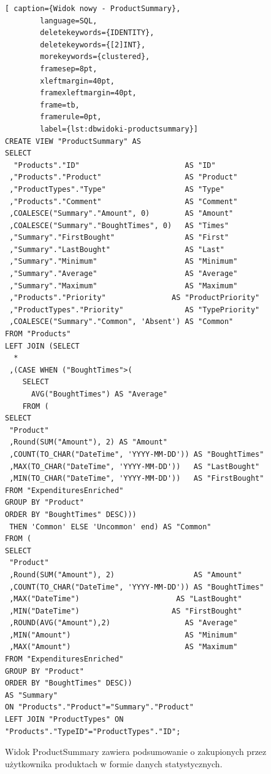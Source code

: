 \documentclass[a4paper,10pt, twoside]{report}
\begin{document}
\begin{large}
\begin{minipage}{\textwidth}
    \begin{lstlisting}[ caption={Widok nowy - ProductSummary},
        language=SQL,
        deletekeywords={IDENTITY},
        deletekeywords={[2]INT},
        morekeywords={clustered},
        framesep=8pt,
        xleftmargin=40pt,
        framexleftmargin=40pt,
        frame=tb,
        framerule=0pt,
        label={lst:dbwidoki-productsummary}]
CREATE VIEW "ProductSummary" AS
SELECT
  "Products"."ID"                        AS "ID"
 ,"Products"."Product"                   AS "Product"
 ,"ProductTypes"."Type"                  AS "Type"
 ,"Products"."Comment"                   AS "Comment"
 ,COALESCE("Summary"."Amount", 0)        AS "Amount"
 ,COALESCE("Summary"."BoughtTimes", 0)   AS "Times"
 ,"Summary"."FirstBought"                AS "First"
 ,"Summary"."LastBought"                 AS "Last"
 ,"Summary"."Minimum"                    AS "Minimum"
 ,"Summary"."Average"                    AS "Average"
 ,"Summary"."Maximum"                    AS "Maximum"
 ,"Products"."Priority"               AS "ProductPriority"
 ,"ProductTypes"."Priority"              AS "TypePriority"
 ,COALESCE("Summary"."Common", 'Absent') AS "Common"
FROM "Products"
LEFT JOIN (SELECT
  *
 ,(CASE WHEN ("BoughtTimes">(
    SELECT
      AVG("BoughtTimes") AS "Average"
    FROM (
SELECT
 "Product"
 ,Round(SUM("Amount"), 2) AS "Amount"
 ,COUNT(TO_CHAR("DateTime", 'YYYY-MM-DD')) AS "BoughtTimes"
 ,MAX(TO_CHAR("DateTime", 'YYYY-MM-DD'))   AS "LastBought"
 ,MIN(TO_CHAR("DateTime", 'YYYY-MM-DD'))   AS "FirstBought"
FROM "ExpendituresEnriched"
GROUP BY "Product"
ORDER BY "BoughtTimes" DESC)))
 THEN 'Common' ELSE 'Uncommon' end) AS "Common"
FROM (
SELECT
 "Product"
 ,Round(SUM("Amount"), 2)                  AS "Amount"
 ,COUNT(TO_CHAR("DateTime", 'YYYY-MM-DD')) AS "BoughtTimes"
 ,MAX("DateTime")                      AS "LastBought"
 ,MIN("DateTime")                     AS "FirstBought"
 ,ROUND(AVG("Amount"),2)                 AS "Average"
 ,MIN("Amount")                          AS "Minimum"
 ,MAX("Amount")                          AS "Maximum"
FROM "ExpendituresEnriched"
GROUP BY "Product"
ORDER BY "BoughtTimes" DESC))
AS "Summary"
ON "Products"."Product"="Summary"."Product"
LEFT JOIN "ProductTypes" ON
"Products"."TypeID"="ProductTypes"."ID";\end{lstlisting}
{Widok ProductSummary zawiera podsumowanie o zakupionych przez użytkownika 
produktach w formie danych statystycznych.}
\end{minipage}


\end{large}
\end{document}

